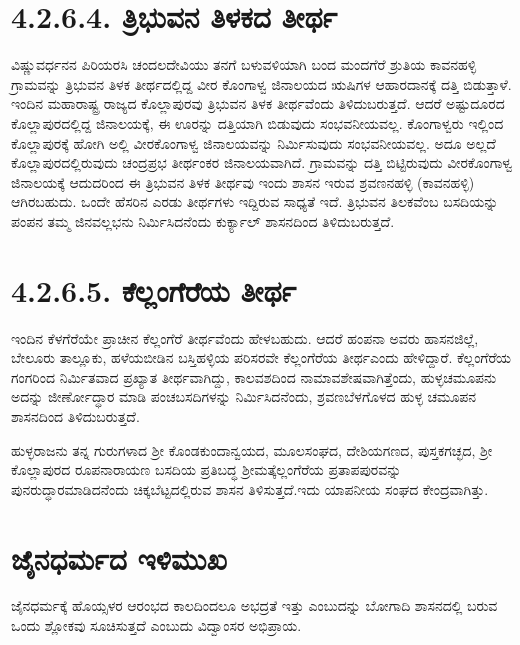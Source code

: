 \section{4.2.6.4. ತ್ರಿಭುವನ ತಿಳಕದ ತೀರ್ಥ}

ವಿಷ್ಣುವರ್ಧನನ ಪಿರಿಯರಸಿ ಚಂದಲದೇವಿಯು ತನಗೆ ಬಳುವಳಿಯಾಗಿ ಬಂದ ಮಂದಗೆರೆ ಶ್ರುತಿಯ ಕಾವನಹಳ್ಳಿ ಗ್ರಾಮವನ್ನು ತ್ರಿಭುವನ ತಿಳಕ ತೀರ್ಥದಲ್ಲಿದ್ದ ವೀರ ಕೊಂಗಾಳ್ವ ಜಿನಾಲಯದ ಋಷಿಗಳ ಆಹಾರದಾನಕ್ಕೆ ದತ್ತಿ ಬಿಡುತ್ತಾಳೆ. ಇಂದಿನ ಮಹಾರಾಷ್ಟ್ರ ರಾಜ್ಯದ ಕೊಲ್ಲಾಪುರವು ತ್ರಿಭುವನ ತಿಳಕ ತೀರ್ಥವೆಂದು ತಿಳಿದುಬರುತ್ತದೆ. ಆದರೆ ಅಷ್ಟುದೂರದ ಕೊಲ್ಲಾಪುರದಲ್ಲಿದ್ದ ಜಿನಾಲಯಕ್ಕೆ, ಈ ಊರನ್ನು ದತ್ತಿಯಾಗಿ ಬಿಡುವುದು ಸಂಭವನೀಯವಲ್ಲ. ಕೊಂಗಾಳ್ವರು ಇಲ್ಲಿಂದ ಕೊಲ್ಲಾಪುರಕ್ಕೆ ಹೋಗಿ ಅಲ್ಲಿ ವೀರಕೊಂಗಾಳ್ವ ಜಿನಾಲಯವನ್ನು ನಿರ್ಮಿಸುವುದು ಸಂಭವನೀಯವಲ್ಲ. ಅದೂ ಅಲ್ಲದೆ ಕೊಲ್ಲಾಪುರದಲ್ಲಿರುವುದು ಚಂದ್ರಪ್ರಭ ತೀರ್ಥಂಕರ ಜಿನಾಲಯವಾಗಿದೆ. ಗ್ರಾಮವನ್ನು ದತ್ತಿ ಬಿಟ್ಟಿರುವುದು ವೀರಕೊಂಗಾಳ್ವ ಜಿನಾಲಯಕ್ಕೆ ಆದುದರಿಂದ ಈ ತ್ರಿಭುವನ ತಿಳಕ ತೀರ್ಥವು ಇಂದು ಶಾಸನ ಇರುವ ಶ್ರವಣನಹಳ್ಳಿ (ಕಾವನಹಳ್ಳಿ) ಆಗಿರಬಹುದು. ಒಂದೇ ಹೆಸರಿನ ಎರಡು ತೀರ್ಥಗಳು ಇದ್ದಿರುವ ಸಾಧ್ಯತೆ ಇದೆ. ತ್ರಿಭುವನ ತಿಲಕವೆಂಬ ಬಸದಿಯನ್ನು ಪಂಪನ ತಮ್ಮ ಜಿನವಲ್ಲಭನು ನಿರ್ಮಿಸಿದನೆಂದು ಕುರ್ಕ್ಯಾಲ್​ ಶಾಸನದಿಂದ ತಿಳಿದುಬರುತ್ತದೆ.


\section{4.2.6.5. ಕೆಲ್ಲಂಗೆರೆಯ ತೀರ್ಥ}

ಇಂದಿನ ಕೆಳಗೆರೆಯೇ ಪ್ರಾಚೀನ ಕೆಲ್ಲಂಗೆರೆ ತೀರ್ಥವೆಂದು ಹೇಳಬಹುದು. ಆದರೆ ಹಂಪನಾ ಅವರು ಹಾಸನಜಿಲ್ಲೆ, ಬೇಲೂರು ತಾಲ್ಲೂಕು, ಹಳೆಯಬೀಡಿನ ಬಸ್ತಿಹಳ್ಳಿಯ ಪರಿಸರವೇ ಕೆಲ್ಲಂಗೆರೆಯ ತೀರ್ಥಎಂದು ಹೇಳಿದ್ದಾರೆ. ಕೆಲ್ಲಂಗೆರೆಯ ಗಂಗರಿಂದ ನಿರ್ಮಿತವಾದ ಪ್ರಖ್ಯಾತ ತೀರ್ಥವಾಗಿದ್ದು, ಕಾಲವಶದಿಂದ ನಾಮಾವಶೇಷವಾಗಿತ್ತೆಂದು, ಹುಳ್ಳಚಮೂಪನು ಅದನ್ನು ಜೀರ್ಣೋದ್ಧಾರ ಮಾಡಿ ಪಂಚಬಸದಿಗಳನ್ನು ನಿರ್ಮಿಸಿದನೆಂದು, ಶ್ರವಣಬೆಳಗೊಳದ ಹುಳ್ಳ ಚಮೂಪನ ಶಾಸನದಿಂದ ತಿಳಿದುಬರುತ್ತದೆ. 

ಹುಳ್ಳರಾಜನು ತನ್ನ ಗುರುಗಳಾದ ಶ‍್ರೀ ಕೊಂಡಕುಂದಾನ್ವಯದ, ಮೂಲಸಂಘದ, ದೇಶಿಯಗಣದ, ಪುಸ್ತಕಗಚ್ಛದ, ಶ‍್ರೀ ಕೊಲ್ಲಾಪುರದ ರೂಪನಾರಾಯಣ ಬಸದಿಯ ಪ್ರತಿಬದ್ಧ ಶ‍್ರೀಮತ್ಕೆಲ್ಲಂಗೆರೆಯ ಪ್ರತಾಪಪುರವನ್ನು ಪುನರುದ್ಧಾರಮಾಡಿದನೆಂದು ಚಿಕ್ಕಬೆಟ್ಟದಲ್ಲಿರುವ ಶಾಸನ ತಿಳಿಸುತ್ತದೆ.ಇದು ಯಾಪನೀಯ ಸಂಘದ ಕೇಂದ್ರವಾಗಿತ್ತು.


\section{ಜೈನಧರ್ಮದ ಇಳಿಮುಖ}

ಜೈನಧರ್ಮಕ್ಕೆ ಹೊಯ್ಸಳರ ಆರಂಭದ ಕಾಲದಿಂದಲೂ ಅಭದ್ರತೆ ಇತ್ತು ಎಂಬುದನ್ನು ಬೋಗಾದಿ ಶಾಸನದಲ್ಲಿ ಬರುವ ಒಂದು ಶ್ಲೋಕವು ಸೂಚಿಸುತ್ತದೆ ಎಂಬುದು ವಿದ್ವಾಂಸರ ಅಭಿಪ್ರಾಯ.

